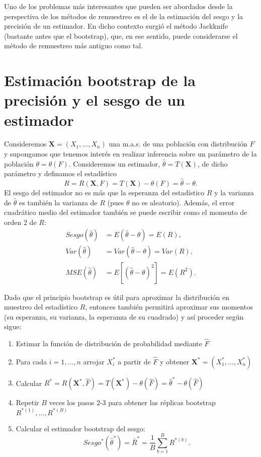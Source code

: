 \documentclass[
]{book}
\theoremstyle{break}
\theoremstyle{definition}
\theoremstyle{definition}
\theoremstyle{definition}
\theoremstyle{definition}
\theoremstyle{remark}
\begin{document}
Uno de los problemas más interesantes que pueden ser abordados desde la
perspectiva de los métodos de remuestreo es el de la estimación del
sesgo y la precisión de un estimador. En dicho contexto surgió el método
Jackknife (bastante antes que el bootstrap), que, en ese sentido, puede
considerarse el método de remuestreo más antiguo como tal.

\hypertarget{prec-sesgo-boot}{%
\section{Estimación bootstrap de la precisión y el sesgo de un estimador}\label{prec-sesgo-boot}}

Consideremos \(\mathbf{X}=\left( X_1,\ldots ,X_n \right)\) una
m.a.s. de una población con distribución \(F\) y supongamos que tenemos
interés en realizar inferencia sobre un parámetro de la población
\(\theta =\theta \left( F \right)\). Consideremos un estimador,
\(\hat{\theta}=T\left( \mathbf{X} \right)\), de dicho parámetro y
definamos el estadístico
\[R=R\left( \mathbf{X}, F \right) = T\left( \mathbf{X} \right) 
- \theta \left( F \right) = \hat{\theta} - \theta.\]
El sesgo del estimador no es más que la esperanza del
estadístico \(R\) y la varianza de \(\hat{\theta}\) es también la varianza
de \(R\) (pues \(\theta\) no es aleatorio). Además, el error cuadrático
medio del estimador también se puede escribir como el momento de orden 2
de \(R\):
\[\begin{aligned}
Sesgo\left( \hat{\theta} \right) &= E\left( \hat{\theta}-\theta \right)
=E\left( R \right), \\
Var\left( \hat{\theta} \right) &= Var\left( \hat{\theta}-\theta \right)
=Var\left( R \right), \\
MSE\left( \hat{\theta} \right) &= E\left[ \left( \hat{\theta}-\theta \right)
^2\right] =E\left( R^2 \right).
\end{aligned}\]

Dado que el principio bootstrap es útil para aproximar la distribución
en muestreo del estadístico \(R\), entonces también permitirá aproximar
sus momentos (su esperanza, su varianza, la esperanza de su cuadrado) y
así proceder según sigue:

\begin{enumerate}
\def\labelenumi{\arabic{enumi}.}
\item
  Estimar la función de distribución de probabilidad mediante \(\hat{F}\)
\item
  Para cada \(i=1,\ldots ,n\) arrojar \(X_i^{\ast}\) a partir de
  \(\hat{F}\) y obtener
  \(\mathbf{X}^{\ast}=\left( X_1^{\ast}, \ldots ,X_n^{\ast} \right)\)
\item
  Calcular \(R^{\ast}=R\left( \mathbf{X}^{\ast},\hat{F} \right) =T\left( \mathbf{X}^{\ast} \right) -\theta \left( \hat{F} \right) = \hat{\theta}^{\ast}- \theta \left( \hat{F} \right)\)
\item
  Repetir \(B\) veces los pasos 2-3 para obtener las réplicas bootstrap
  \(R^{\ast (1)}, \ldots, R^{\ast (B)}\)
\item
  Calcular el estimador bootstrap del sesgo:
  \[Sesgo^{\ast}\left( \hat{\theta}^{\ast} \right) =\bar{R}^{\ast}=\frac{1
  }{B}\sum_{b=1}^{B}R^{\ast (b)}.\]
\end{enumerate}
\end{document}
